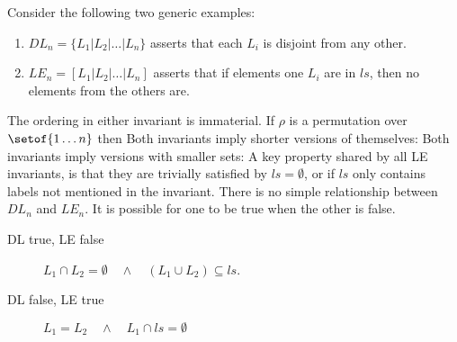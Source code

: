 Consider the following two generic examples:
\begin{enumerate}
  \item
    $DL_n = \{L_1|L_2|\dots|L_n\}$
    asserts that each $L_i$ is disjoint from any other.
  \item
    $LE_n = [L_1|L_2|\dots|L_n]$
    asserts that if elements one $L_i$ are in $ls$,
    then no elements from the others are.
\end{enumerate}

The ordering in either invariant is immaterial.
If $\rho$ is a permutation over $\setof{1\dots n}$ then
Both invariants imply shorter versions of themselves:
Both invariants imply versions with smaller sets:
A key property shared by all LE invariants,
is that they are trivially satisfied by $ls = \emptyset$,
or if $ls$ only contains labels not mentioned in the invariant.
There is no simple relationship between $DL_n$ and $LE_n$.
It is possible for one to be true when the other is false.
\begin{description}
  \item[DL true, LE false]
    $L_1 \cap L_2 = \emptyset \quad\land\quad (L_1 \cup L_2) \subseteq ls$.
  \item[DL false, LE true]
    $L_1 = L_2 \quad\land\quad L_1 \cap ls = \emptyset$
\end{description}
